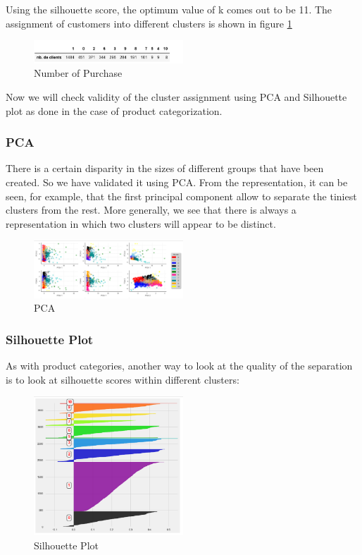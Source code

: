 Using the silhouette score, the optimum value of k comes out to be 11. The assignment of customers into different clusters is shown in figure \ref{4.3}

\begin{figure}[H]
\caption{Number of Purchase}
\label{4.3}
\centering
\includegraphics[width=0.5\textwidth]{images/4_3.PNG}
\end{figure}

Now we will check validity of the cluster assignment using PCA and Silhouette plot as done in the case of product categorization.\\

\subsubsection{\textbf{PCA}}

There is a certain disparity in the sizes of different groups that have been created. So we have validated it using PCA. From the representation, it can be seen, for example, that the first principal component allow to separate the tiniest clusters from the rest. More generally, we see that there is always a representation in which two clusters will appear to be distinct.\\


\begin{figure}[H]
\caption{PCA}
\label{4.4}
\centering
\includegraphics[width=0.5\textwidth]{images/4_4.PNG}
\end{figure}

\subsubsection{\textbf{Silhouette Plot}}

As with product categories, another way to look at the quality of the separation is to look at silhouette scores within different clusters:\\

\begin{figure}[H]
\caption{Silhouette Plot}
\label{4.5}
\centering
\includegraphics[width=0.5\textwidth]{images/4_5.PNG}
\end{figure}

